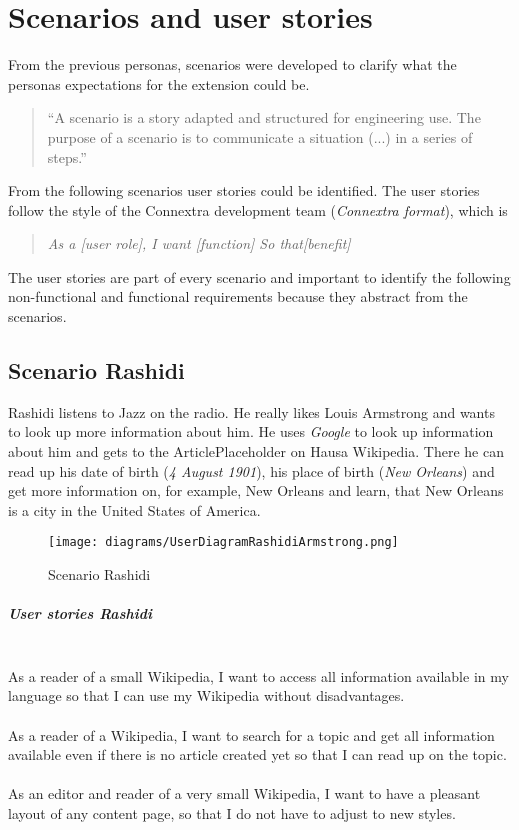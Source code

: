 \chapter{Scenarios and user stories}

From the previous personas, scenarios were developed to clarify what the personas expectations for the extension could be.
\begin{quote}
``A scenario is a story adapted and structured for engineering use. The purpose of a scenario is to communicate a situation (...) in a series of steps.''  
\end{quote} \citep[98]{scenario}
From the following scenarios user stories could be identified. The user stories follow the style of the Connextra development team (\textit{Connextra format}), which is
\begin{quote}
\textit{As a [user role], \newline I want [function] \newline So that[benefit]}
\end{quote} 
\citep{connextrastory,userstory}
The user stories are part of every scenario and important to identify the following non-functional and functional requirements because they abstract from the scenarios. 

\section{Scenario Rashidi}
Rashidi listens to Jazz on the radio. He really likes Louis Armstrong and wants to look up more information about him. He uses \textit{Google} to look up information about him and gets to the ArticlePlaceholder on Hausa Wikipedia. There he can read up his date of birth (\textit{4 August 1901}), his place of birth (\textit{New Orleans}) \citep{wd:03} and get more information on, for example, New Orleans and learn, that New Orleans is a city in the United States of America. 
\begin{figure}[H]
	\centering
	\texttt{[image: diagrams/UserDiagramRashidiArmstrong.png]}
	\caption{Scenario Rashidi}
	\label{fig:ScenarioRashidi}
\end{figure}

\paragraph{User stories Rashidi} ~\\
As a reader of a small Wikipedia, I want to access all information available in my language so that I can use my Wikipedia without disadvantages. \\
\\
As a reader of a Wikipedia, I want to search for a topic and get all information available even if there is no article created yet so that I can read up on the topic. \\
\\
As an editor and reader of a very small Wikipedia, I want to have a pleasant layout of any content page, so that I do not have to adjust to new styles.

